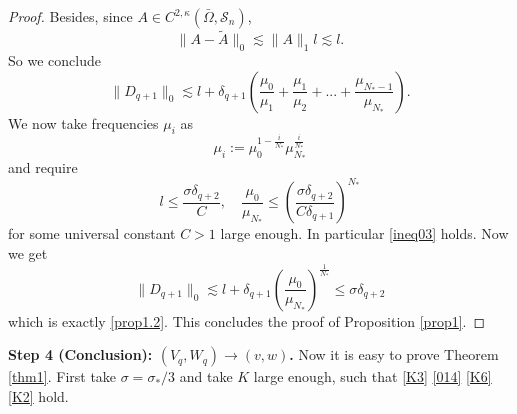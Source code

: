 \documentclass[reqno,12pt]{amsart}
\numberwithin{equation}{section}
\theoremstyle{plain}
\theoremstyle{definition}
\renewcommand{\S}{{\mathcal{S}_n}}
\begin{document}
\begin{proof}
Besides, since $A\in C^{2,\kappa}(\bar\Omega,\S)$,
\begin{equation*}
    \|A-\tilde A\|_0\lesssim \|A\|_1 l\lesssim l.
\end{equation*}
So we conclude
\begin{equation*}
    \|D_{q+1}\|_0\lesssim l+\delta_{q+1}(\frac{\mu_0}{\mu_1}
    +\frac{\mu_1}{\mu_2}+...+\frac{\mu_{N_*-1}}{\mu_{N_*}}).
\end{equation*}
We now take frequencies $\mu_i$ as
\begin{equation*}
    \mu_i:=\mu_0^{1-\frac{i}{N_*}}\mu_{N_*}^\frac{i}{N_*}
\end{equation*}
and require
\begin{equation}\label{ineq**}
    l\le \frac{\sigma\delta_{q+2}}{C},\quad 
    \frac{\mu_0}{\mu_{N_*}}\le
    (\frac{\sigma\delta_{q+2}}{C\delta_{q+1}})^{N_*}
\end{equation}
for some universal constant $C>1$ large enough. 
In particular \eqref{ineq03} holds.
Now we get
\begin{equation*}
\|D_{q+1}\|_0\lesssim l+\delta_{q+1}(\frac{\mu_0}{\mu_{N_*}})^\frac{1}{N_*}\le{\sigma}\delta_{q+2}
\end{equation*}
which is exactly \eqref{prop1.2}. This concludes the proof of Proposition \ref{prop1}.
\end{proof}

\textbf{Step 4 (Conclusion): $(V_q,W_q)\to(v,w)$.}
Now it is easy to prove Theorem \ref{thm1}. First take $\sigma=\sigma_*/3$ and take $K$ large enough, such that \eqref{K3} \eqref{014} \eqref{K6} \eqref{K2} hold.
\end{document}
